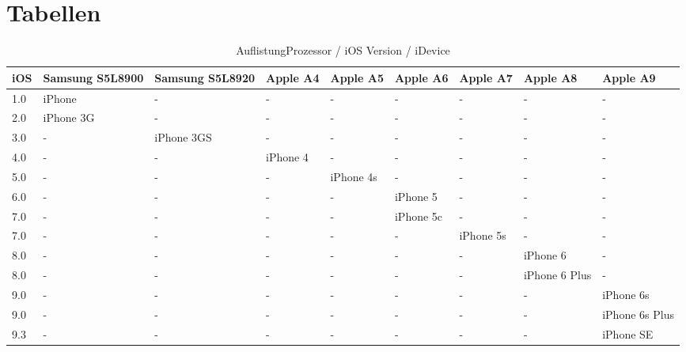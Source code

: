 \newpage
\chapter{Tabellen}
\begin{table}[htp!]
    \begin{center}
        \begin{tabular}{| p{8mm} | p{18mm} | p{18mm} | p{15mm} | p{15mm} | p{15mm} | p{15mm} | p{15mm} | p{15mm} |} \hline
\textbf{iOS} & \textbf{Samsung S5L8900} & \textbf{Samsung S5L8920} & \textbf{Apple A4}	& \textbf{Apple A5}	& \textbf{Apple A6} & \textbf{Apple A7} & \textbf{Apple A8} & \textbf{Apple A9} \\ \hline
1.0 & iPhone & - & - &  - &  - & - &  - & - \\ \hline		
2.0 & iPhone 3G & - & - &  - &  - & - &  - & - \\ \hline				
3.0 & - & iPhone 3GS & - &  - &  - & - &  - & -	\\ \hline			
4.0 & - &  - & iPhone 4	 &  - &  - & - &  - & -	\\ \hline		
5.0 &  - & - &  - &	iPhone 4s &  - & - &  - & - \\ \hline		
6.0 &  - &  - & - &  - & iPhone 5 & - &  - & -	\\ \hline	
7.0 &  - &  - & - &  - & iPhone 5c	& - &  - & - \\ \hline	
7.0 & - &  - &  - & - &  - & iPhone 5s &  - & - \\ \hline
8.0 & - & - &  - &  - & - &  - & iPhone 6 & - \\ \hline
8.0 & - & - &  - &  - & - &  - & iPhone 6 Plus & -\\ \hline
9.0 & - & - &  - &  - & - &  - & - & iPhone 6s \\ \hline
9.0 & - & - &  - &  - & - &  - & - & iPhone 6s Plus \\ \hline
9.3 & - & - &  - &  - & - &  - & - & iPhone SE \\ \hline     
        \end{tabular} 
        \caption{AuflistungProzessor / iOS Version / iDevice  }
        \label{tab:AuflistungProziOSVersioniDevice}
    \end{center}
\end{table}




